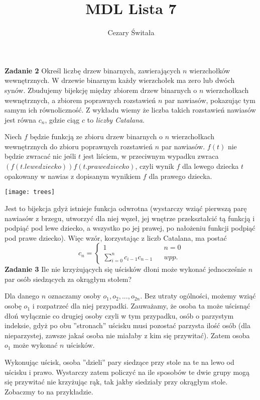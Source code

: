 \documentclass[12pt,a4paper]{article}
\title{MDL Lista 7}
\author{Cezary Świtała}
\begin{document}
\maketitle

\noindent
\textbf{Zadanie 2} Określ liczbę drzew binarnych, zawierających \(n\) wierzchołków wewnętrznych. W drzewie binarnym każdy wierzchołek ma zero lub dwóch synów.
\vskip 0.1cm
	Zbudujemy bijekcję między zbiorem drzew binarnych o \( n \) wierzchołkach wewnętrznych, a zbiorem poprawnych rozstawień \(n\) par nawiasów, pokazując tym samym ich równoliczność. Z wykładu wiemy że liczba takich rozstawień nawiasów jest równa \(c_n\), gdzie ciąg \(c\) to \textit{liczby Catalana}.
	
	Niech \(f\) będzie funkcją ze zbioru drzew binarnych o \(n\) wierzchołkach wewnętrznych do zbioru poprawnych rozstawień \(n\) par nawiasów. \(f(t)\) nie będzie zwracać nic jeśli \(t\) jest liściem, w przeciwnym wypadku zwraca \( ( f(t.lewedziecko))f(t.prawedziecko) \), czyli wynik \(f\) dla lewego dziecka \(t\) opakowany w nawias z dopisanym wynikiem \(f\) dla prawego dziecka. 

\texttt{[image: trees]}

Jest to bijekcja gdyż istnieje funkcja odwrotna (wystarczy wziąć pierwszą parę nawiasów z brzegu, utworzyć dla niej węzeł, jej wnętrze przekształcić tą funkcją i podpiąć pod lewe dziecko, a wszystko po jej prawej, po nałożeniu funkcji podpiąć pod prawe dziecko). Więc wzór, korzystając z liczb Catalana, ma postać
\[
	c_n = 
	\left\{
		\begin{array}{lll}
			1 & & n = 0 \\
			\sum_{i=0}^n c_{i-1}c_{n-1} & & wpp.
		\end{array}				
	\right.
\]
\vskip 0.5cm
\noindent
\textbf{Zadanie 3} Ile nie krzyżujących się uścisków dłoni może wykonać jednocześnie \(n\) par osób siedzących za okrągłym stołem?
	
Dla danego \(n\) oznaczamy osoby \( o_1, o_2, ... , o_{2n} \). Bez utraty ogólności, możemy wziąć osobę \(o_1\) i rozpatrzeć dla niej przypadki. Zauważamy, że osoba ta może uścisnąć dłoń wyłącznie co drugiej osoby czyli w tym przypadku, osób o parzystym indeksie, gdyż po obu ''stronach'' uścisku musi pozostać parzysta ilość osób (dla nieparzystej, zawsze jakaś osoba nie miałaby z kim się przywitać). Zatem osoba \(o_1\) może wykonać \(n\) uścisków.

Wykonując uścisk, osoba ''dzieli'' pary siedzące przy stole na te na lewo od uścisku i prawo. Wystarczy zatem policzyć na ile sposobów te dwie grupy mogą się przywitać nie krzyżując rąk, tak jakby siedziały przy okrągłym stole. Zobaczmy to na przykładzie.
\end{document}
